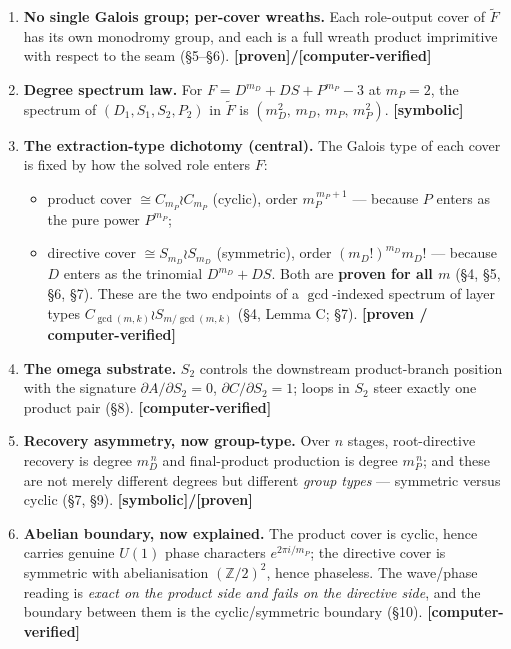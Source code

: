 \documentclass[11pt]{article}
\providecommand{\tightlist}{\setlength{\itemsep}{0pt}\setlength{\parskip}{0pt}}
\theoremstyle{plain}
\theoremstyle{definition}
\theoremstyle{remark}
\begin{document}
\begin{enumerate}
\def\labelenumi{\arabic{enumi}.}
\item
  \textbf{No single Galois group; per-cover wreaths.} Each role-output cover of \(\widetilde F\) has its own monodromy group, and each is a full wreath product imprimitive with respect to the seam (§5--§6). \textbf{{[}proven{]}/{[}computer-verified{]}}
\item
  \textbf{Degree spectrum law.} For \(F = D^{m_D}+DS+P^{m_P}-3\) at \(m_P=2\), the spectrum of \((D_1,S_1,S_2,P_2)\) in \(\widetilde F\) is \((m_D^2,\,m_D,\,m_P,\,m_P^2)\). \textbf{{[}symbolic{]}}
\item
  \textbf{The extraction-type dichotomy (central).} The Galois type of each cover is fixed by how the solved role enters \(F\):

  \begin{itemize}
  \tightlist
  \item
    product cover \(\cong C_{m_P}\wr C_{m_P}\) (cyclic), order \(m_P^{\,m_P+1}\) --- because \(P\) enters as the pure power \(P^{m_P}\);
  \item
    directive cover \(\cong S_{m_D}\wr S_{m_D}\) (symmetric), order \((m_D!)^{m_D}m_D!\) --- because \(D\) enters as the trinomial \(D^{m_D}+DS\). Both are \textbf{proven for all \(m\)} (§4, §5, §6, §7). These are the two endpoints of a \(\gcd\)-indexed spectrum of layer types \(C_{\gcd(m,k)}\wr S_{m/\gcd(m,k)}\) (§4, Lemma C; §7). \textbf{{[}proven / computer-verified{]}}
  \end{itemize}
\item
  \textbf{The omega substrate.} \(S_2\) controls the downstream product-branch position with the signature \(\partial A/\partial S_2=0\), \(\partial C/\partial S_2 = 1\); loops in \(S_2\) steer exactly one product pair (§8). \textbf{{[}computer-verified{]}}
\item
  \textbf{Recovery asymmetry, now group-type.} Over \(n\) stages, root-directive recovery is degree \(m_D^{\,n}\) and final-product production is degree \(m_P^{\,n}\); and these are not merely different degrees but different \emph{group types} --- symmetric versus cyclic (§7, §9). \textbf{{[}symbolic{]}/{[}proven{]}}
\item
  \textbf{Abelian boundary, now explained.} The product cover is cyclic, hence carries genuine \(U(1)\) phase characters \(e^{2\pi i/m_P}\); the directive cover is symmetric with abelianisation \((\mathbb Z/2)^2\), hence phaseless. The wave/phase reading is \emph{exact on the product side and fails on the directive side}, and the boundary between them is the cyclic/symmetric boundary (§10). \textbf{{[}computer-verified{]}}
\end{enumerate}
\end{document}
